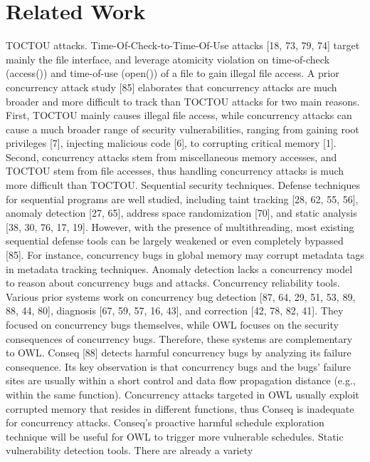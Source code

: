\section{Related Work} \label{sec:related}

TOCTOU attacks. Time-Of-Check-to-Time-Of-Use attacks
[18, 73, 79, 74] target mainly the file interface, and
leverage atomicity violation on time-of-check (access())
and time-of-use (open()) of a file to gain illegal file access.
A prior concurrency attack study [85] elaborates that concurrency
attacks are much broader and more difficult to track
than TOCTOU attacks for two main reasons. First, TOCTOU
mainly causes illegal file access, while concurrency attacks
can cause a much broader range of security vulnerabilities,
ranging from gaining root privileges [7], injecting malicious
code [6], to corrupting critical memory [1]. Second, concurrency
attacks stem from miscellaneous memory accesses, and
TOCTOU stem from file accesses, thus handling concurrency
attacks is much more difficult than TOCTOU.
Sequential security techniques. Defense techniques for sequential
programs are well studied, including taint tracking
[28, 62, 55, 56], anomaly detection [27, 65], address space
randomization [70], and static analysis [38, 30, 76, 17, 19].
However, with the presence of multithreading, most existing
sequential defense tools can be largely weakened or even
completely bypassed [85]. For instance, concurrency bugs
in global memory may corrupt metadata tags in metadata
tracking techniques. Anomaly detection lacks a concurrency
model to reason about concurrency bugs and attacks.
Concurrency reliability tools. Various prior systems work
on concurrency bug detection [87, 64, 29, 51, 53, 89, 88, 44,
80], diagnosis [67, 59, 57, 16, 43], and correction [42, 78,
82, 41]. They focused on concurrency bugs themselves, while
OWL focuses on the security consequences of concurrency
bugs. Therefore, these systems are complementary to OWL.
Conseq [88] detects harmful concurrency bugs by analyzing
its failure consequence. Its key observation is that concurrency
bugs and the bugs’ failure sites are usually within a
short control and data flow propagation distance (e.g., within
the same function). Concurrency attacks targeted in OWL
usually exploit corrupted memory that resides in different
functions, thus Conseq is inadequate for concurrency attacks.
Conseq’s proactive harmful schedule exploration technique
will be useful for OWL to trigger more vulnerable schedules.
Static vulnerability detection tools. There are already a variety

